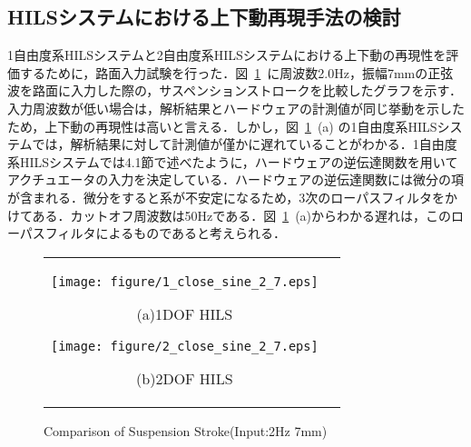 \documentclass[a4paper,12pt]{article_vdlab_sotsuron}
\begin{document}
\newpage
\subsection{HILSシステムにおける上下動再現手法の検討}
1自由度系HILSシステムと2自由度系HILSシステムにおける上下動の再現性を評価するために，路面入力試験を行った．図~\ref{fig:compare_2_7}~に周波数2.0Hz，振幅7mmの正弦波を路面に入力した際の，サスペンションストロークを比較したグラフを示す．入力周波数が低い場合は，解析結果とハードウェアの計測値が同じ挙動を示したため，上下動の再現性は高いと言える．しかし，図~\ref{fig:compare_2_7}~(a) の1自由度系HILSシステムでは，解析結果に対して計測値が僅かに遅れていることがわかる．1自由度系HILSシステムでは4.1節で述べたように，ハードウェアの逆伝達関数を用いてアクチュエータの入力を決定している．ハードウェアの逆伝達関数には微分の項が含まれる．微分をすると系が不安定になるため，3次のローパスフィルタをかけてある．カットオフ周波数は50Hzである．図~\ref{fig:compare_2_7}~(a)からわかる遅れは，このローパスフィルタによるものであると考えられる．\par

\vspace*{10mm}
\begin{figure}[h]
  \begin{tabular}{cc}
  \begin{minipage}{0.5\hsize}
  \begin{center} 
    \texttt{[image: figure/1\_close\_sine\_2\_7.eps]}
    \end{center}
    \begin{center}
    \vspace*{3mm}
    \ (a)1DOF HILS\
    \end{center}
  \end{minipage}
  \begin{minipage}{0.5\hsize}
     \begin{center}
      \texttt{[image: figure/2\_close\_sine\_2\_7.eps]}
      \end{center}
      \begin{center}
      \vspace*{3mm}
      \ (b)2DOF HILS\
    \end{center}
  \end{minipage}
  \end{tabular}
  \vspace*{3mm}
  \caption{Comparison of Suspension Stroke(Input:2Hz 7mm)}
    \label{fig:compare_2_7}
\end{figure}
\end{document}
